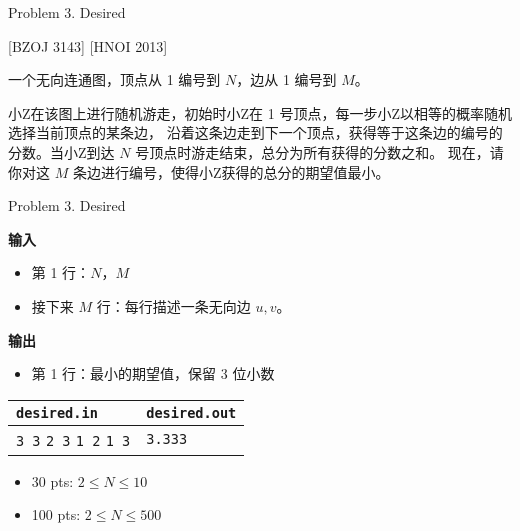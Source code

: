 \documentclass[UTF8]{beamer}
\begin{document}

\begin{frame}{Problem 3. Desired}

[BZOJ 3143] [HNOI 2013]

一个无向连通图，顶点从 1 编号到 $N$，边从 1 编号到 $M$。

小Z在该图上进行随机游走，初始时小Z在 1 号顶点，每一步小Z以相等的概率随机选择当前顶点的某条边，
沿着这条边走到下一个顶点，获得等于这条边的编号的分数。当小Z到达 $N$ 号顶点时游走结束，总分为所有获得的分数之和。
现在，请你对这 $M$ 条边进行编号，使得小Z获得的总分的期望值最小。

\end{frame}

\begin{frame}{Problem 3. Desired}

\textbf{输入}
\begin{itemize}
    \item 第 1 行：$N$，$M$
    \item 接下来 $M$ 行：每行描述一条无向边 $u, v$。
\end{itemize}
\textbf{输出}
\begin{itemize}
    \item 第 1 行：最小的期望值，保留 3 位小数
\end{itemize}

\begin{tabularx}{\textwidth}{|X|X|}
\hline
\texttt{\textbf{desired.in}} & \texttt{\textbf{desired.out}} \\ \hline
\texttt{3 3}\newline
\texttt{2 3}\newline
\texttt{1 2}\newline
\texttt{1 3}
&
\texttt{3.333}
\\ \hline
\end{tabularx}
\newline
\begin{itemize}
    \item 30 pts: $2 \leq N \leq 10$
    \item 100 pts: $2 \leq N \leq 500$
\end{itemize}

\end{frame}
\end{document}
